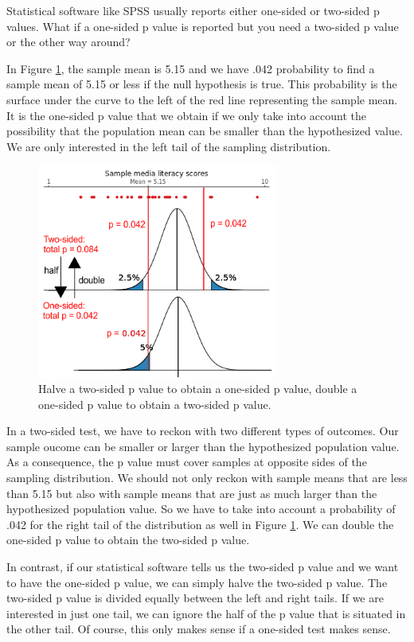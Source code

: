 \documentclass[a4paper]{book}
\theoremstyle{definition}
\theoremstyle{definition}
\theoremstyle{definition}
\theoremstyle{remark}
\begin{document}
Statistical software like SPSS usually reports either one-sided or
two-sided p values. What if a one-sided p value is reported but you need
a two-sided p value or the other way around?

In Figure \ref{fig:1-2sidedpvalues}, the sample mean is 5.15 and we have
.042 probability to find a sample mean of 5.15 or less if the null
hypothesis is true. This probability is the surface under the curve to
the left of the red line representing the sample mean. It is the
one-sided p value that we obtain if we only take into account the
possibility that the population mean can be smaller than the
hypothesized value. We are only interested in the left tail of the
sampling distribution.

\begin{figure}
\centering
\includegraphics[width=300px]{figures/CH4.1_2sidedpvalues.png}
\caption{\label{fig:1-2sidedpvalues}Halve a two-sided p value to obtain a
one-sided p value, double a one-sided p value to obtain a two-sided p
value.}
\end{figure}

In a two-sided test, we have to reckon with two different types of
outcomes. Our sample oucome can be smaller or larger than the
hypothesized population value. As a consequence, the p value must cover
samples at opposite sides of the sampling distribution. We should not
only reckon with sample means that are less than 5.15 but also with
sample means that are just as much larger than the hypothesized
population value. So we have to take into account a probability of .042
for the right tail of the distribution as well in Figure
\ref{fig:1-2sidedpvalues}. We can double the one-sided p value to obtain
the two-sided p value.

In contrast, if our statistical software tells us the two-sided p value
and we want to have the one-sided p value, we can simply halve the
two-sided p value. The two-sided p value is divided equally between the
left and right tails. If we are interested in just one tail, we can
ignore the half of the p value that is situated in the other tail. Of
course, this only makes sense if a one-sided test makes sense.
\end{document}
